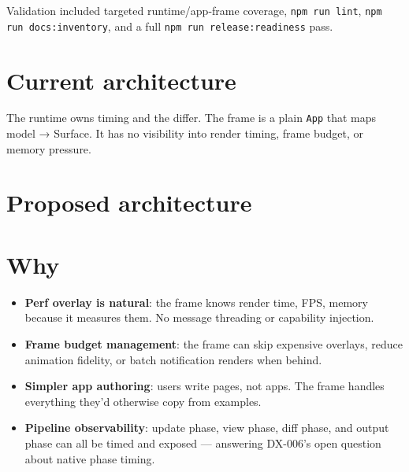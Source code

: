 Validation included targeted runtime/app-frame coverage, \texttt{n\allowbreak{}p\allowbreak{}m\allowbreak{} \allowbreak{}r\allowbreak{}u\allowbreak{}n\allowbreak{} \allowbreak{}l\allowbreak{}i\allowbreak{}n\allowbreak{}t}, \texttt{n\allowbreak{}p\allowbreak{}m\allowbreak{} \allowbreak{}r\allowbreak{}u\allowbreak{}n\allowbreak{} \allowbreak{}d\allowbreak{}o\allowbreak{}c\allowbreak{}s\allowbreak{}:\allowbreak{}i\allowbreak{}n\allowbreak{}v\allowbreak{}e\allowbreak{}n\allowbreak{}t\allowbreak{}o\allowbreak{}r\allowbreak{}y}, and a full \texttt{n\allowbreak{}p\allowbreak{}m\allowbreak{} \allowbreak{}r\allowbreak{}u\allowbreak{}n\allowbreak{} \allowbreak{}r\allowbreak{}e\allowbreak{}l\allowbreak{}e\allowbreak{}a\allowbreak{}s\allowbreak{}e\allowbreak{}:\allowbreak{}r\allowbreak{}e\allowbreak{}a\allowbreak{}d\allowbreak{}i\allowbreak{}n\allowbreak{}e\allowbreak{}s\allowbreak{}s} pass.

\section{Current architecture}\label{record-373-current-architecture}



The runtime owns timing and the differ. The frame is a plain \texttt{A\allowbreak{}p\allowbreak{}p} that maps model → Surface. It has no visibility into render timing, frame budget, or memory pressure.

\section{Proposed architecture}\label{record-373-proposed-architecture}



\section{Why}\label{record-373-why}

\begin{itemize}
\tightlist
\item
  \textbf{Perf overlay is natural}: the frame knows render time, FPS, memory because it measures them. No message threading or capability injection.
\item
  \textbf{Frame budget management}: the frame can skip expensive overlays, reduce animation fidelity, or batch notification renders when behind.
\item
  \textbf{Simpler app authoring}: users write pages, not apps. The frame handles everything they'd otherwise copy from examples.
\item
  \textbf{Pipeline observability}: update phase, view phase, diff phase, and output phase can all be timed and exposed --- answering DX-006's open question about native phase timing.
\end{itemize}

